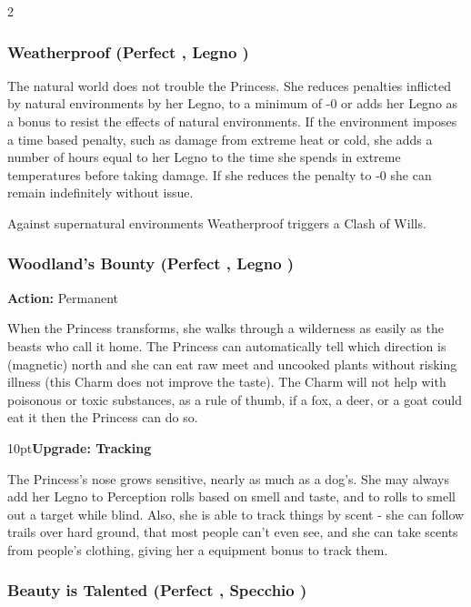 \begin{multicols}{2}
\subsubsection*{Weatherproof (Perfect \textbullet, Legno \textbullet)}

The natural world does not trouble the Princess. She reduces penalties inflicted by natural environments by her Legno, to a minimum of -0 or adds her Legno as a bonus to resist the effects of natural environments. If the environment imposes a time based penalty, such as damage from extreme heat or cold, she adds a number of hours equal to her Legno to the time she spends in extreme temperatures before taking damage. If she reduces the penalty to -0 she can remain indefinitely without issue. 

Against supernatural environments Weatherproof triggers a Clash of Wills.

\subsubsection*{Woodland's Bounty (Perfect \textbullet, Legno \textbullet)}

\noindent \textbf{Action:} Permanent

When the Princess transforms, she walks through a wilderness as easily as the beasts who call it home. The Princess can automatically tell which direction is (magnetic) north and she can eat raw meet and uncooked plants without risking illness (this Charm does not improve the taste). The Charm will not help with poisonous or toxic substances, as a rule of thumb, if a fox, a deer, or a goat could eat it then the Princess can do so. 

\begin{myindentpar}{10pt}\textbf{Upgrade: Tracking}

The Princess's nose grows sensitive, nearly as much as a dog's. She may always add her Legno to Perception rolls based on smell and taste, and to rolls to smell out a target while blind. Also, she is able to track things by scent - she can follow trails over hard ground, that most people can't even see, and she can take scents from people's clothing, giving her a equipment bonus to track them.\end{myindentpar}

\subsubsection*{Beauty is Talented (Perfect \textbullet, Specchio \textbullet)}


\end{multicols}
